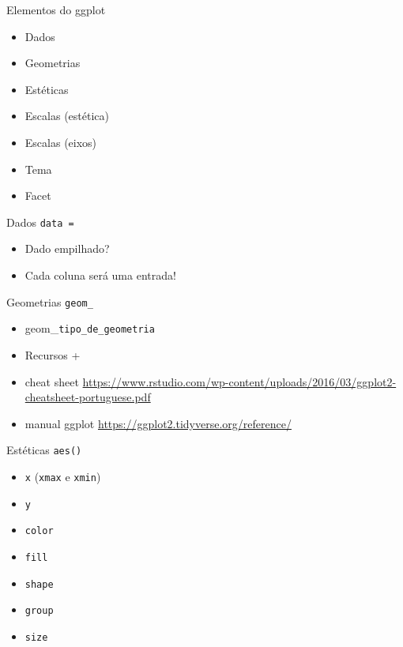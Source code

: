 \documentclass[
  9pt,
  ignorenonframetext,
]{beamer}
\begin{document}
\begin{frame}{Elementos do ggplot}
\protect\hypertarget{elementos-do-ggplot}{}
\begin{itemize}
\item
  Dados
\item
  Geometrias
\item
  Estéticas
\item
  Escalas (estética)
\item
  Escalas (eixos)
\item
  Tema
\item
  Facet
\end{itemize}
\end{frame}

\begin{frame}{Dados \texttt{data\ =}}
\protect\hypertarget{dados-data}{}
\begin{itemize}
\item
  Dado empilhado?
\item
  Cada coluna será uma entrada!
\end{itemize}
\end{frame}

\begin{frame}[fragile]{Geometrias \texttt{geom\_}}
\protect\hypertarget{geometrias-geom_}{}
\begin{itemize}
\item
  geom\_\texttt{tipo\_de\_geometria}
\item
  Recursos +
\item
  cheat sheet
  \url{https://www.rstudio.com/wp-content/uploads/2016/03/ggplot2-cheatsheet-portuguese.pdf}
\item
  manual ggplot \url{https://ggplot2.tidyverse.org/reference/}
\end{itemize}
\end{frame}

\begin{frame}[fragile]{Estéticas \texttt{aes()}}
\protect\hypertarget{estuxe9ticas-aes}{}
\begin{itemize}
\item
  \texttt{x} (\texttt{xmax} e \texttt{xmin})
\item
  \texttt{y}
\item
  \texttt{color}
\item
  \texttt{fill}
\item
  \texttt{shape}
\item
  \texttt{group}
\item
  \texttt{size}
\end{itemize}
\end{frame}
\end{document}
